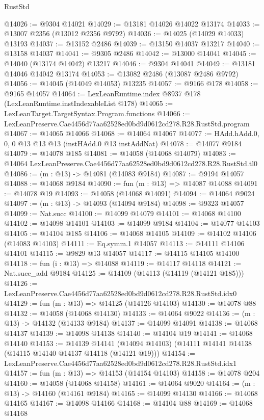 \begin{lexlean}{RustStd}
\begin{coremodule}
@14026 := @9304 @14021
@14029 := @13181 @14026 @14022 @13174
@14033 := @13007 @2356 (@13012 @2356 @9792)
@14036 := @14025 (@14029 @14033) @13193
@14037 := @13152 @2486
@14039 := @13150 @14037 @13217
@14040 := @13158 @14037
@14041 := @9305 @2486
@14042 := @13000 @14041
@14045 := @14040 (@13174 @14042) @13217
@14046 := @9304 @14041
@14049 := @13181 @14046 @14042 @13174
@14053 := @13082 @2486 (@13087 @2486 @9792)
@14056 := @14045 (@14049 @14053) @13235
@14057 := @9166 @178
@14058 := @9165 @14057
@14064 := LexLeanRuntime.index @8937 @178 (LexLeanRuntime.instIndexableList @178)
@14065 := LexLeanTarget.TargetSyntax.Program.functions
@14066 := LexLeanPreserve.Cae4456d77aa62528ed0bd9d0612cd278.R28.RustStd.program
@14067 := @14065 @14066
@14068 := @14064 @14067
@14077 := HAdd.hAdd.{0, 0, 0} @13 @13 @13 (instHAdd.{0} @13 instAddNat)
@14078 := @14077 @9184
@14079 := @14078 @185
@14081 := @14058 (@14068 @14079)
@14083 := @14064 LexLeanPreserve.Cae4456d77aa62528ed0bd9d0612cd278.R28.RustStd.tl0
@14086 := (m : @13) -> @14081 (@14083 @9184)
@14087 := @9194 @14057
@14088 := @14068 @9184
@14090 := fun (m : @13) => @14087 @14088
@14091 := @14078 @19
@14093 := @14058 (@14068 @14091)
@14094 := @14064 @9024
@14097 := (m : @13) -> @14093 (@14094 @9184)
@14098 := @9323 @14057
@14099 := Nat.succ
@14100 := @14099 @14079
@14101 := @14068 @14100
@14102 := @14098 @14101
@14103 := @14099 @9184
@14104 := @14077 @14103
@14105 := @14104 @185
@14106 := @14068 @14105
@14109 := @14102 @14106 (@14083 @14103)
@14111 := Eq.symm.{1} @14057
@14113 := @14111 @14106 @14101
@14115 := @9829 @13 @14057
@14117 := @14115 @14105 @14100
@14118 := fun (i : @13) => @14088
@14119 := @14117 @14118
@14121 := Nat.succ_add @9184
@14125 := @14109 (@14113 (@14119 (@14121 @185)))
@14126 := LexLeanPreserve.Cae4456d77aa62528ed0bd9d0612cd278.R28.RustStd.idx0
@14129 := fun (m : @13) => @14125 (@14126 @14103)
@14130 := @14078 @88
@14132 := @14058 (@14068 @14130)
@14133 := @14064 @9022
@14136 := (m : @13) -> @14132 (@14133 @9184)
@14137 := @14099 @14091
@14138 := @14068 @14137
@14139 := @14098 @14138
@14140 := @14104 @19
@14141 := @14068 @14140
@14153 := @14139
    @14141
    (@14094 @14103)
    (@14111 @14141 @14138 (@14115 @14140 @14137 @14118 (@14121 @19)))
@14154 := LexLeanPreserve.Cae4456d77aa62528ed0bd9d0612cd278.R28.RustStd.idx1
@14157 := fun (m : @13) => @14153 (@14154 @14103)
@14158 := @14078 @204
@14160 := @14058 (@14068 @14158)
@14161 := @14064 @9020
@14164 := (m : @13) -> @14160 (@14161 @9184)
@14165 := @14099 @14130
@14166 := @14068 @14165
@14167 := @14098 @14166
@14168 := @14104 @88
@14169 := @14068 @14168

\end{coremodule}
\end{lexlean}
